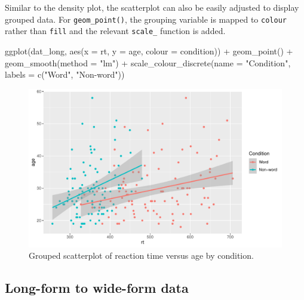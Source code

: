 \documentclass[
  english,
  doc,floatsintext]{apa6}
\newenvironment{Shaded}{\begin{snugshade}}{\end{snugshade}}
\newcommand{\AttributeTok}[1]{\textcolor[rgb]{0.77,0.63,0.00}{#1}}
\newcommand{\FunctionTok}[1]{\textcolor[rgb]{0.00,0.00,0.00}{#1}}
\newcommand{\NormalTok}[1]{#1}
\newcommand{\SpecialCharTok}[1]{\textcolor[rgb]{0.00,0.00,0.00}{#1}}
\newcommand{\StringTok}[1]{\textcolor[rgb]{0.31,0.60,0.02}{#1}}
\begin{document}
Similar to the density plot, the scatterplot can also be easily adjusted to display grouped data. For \texttt{geom\_point()}, the grouping variable is mapped to \texttt{colour} rather than \texttt{fill} and the relevant \texttt{scale\_} function is added.

\begin{Shaded}
\begin{Highlighting}[]
\FunctionTok{ggplot}\NormalTok{(dat\_long, }\FunctionTok{aes}\NormalTok{(}\AttributeTok{x =}\NormalTok{ rt, }\AttributeTok{y =}\NormalTok{ age, }\AttributeTok{colour =}\NormalTok{ condition)) }\SpecialCharTok{+}
  \FunctionTok{geom\_point}\NormalTok{() }\SpecialCharTok{+}
  \FunctionTok{geom\_smooth}\NormalTok{(}\AttributeTok{method =} \StringTok{"lm"}\NormalTok{) }\SpecialCharTok{+}
  \FunctionTok{scale\_colour\_discrete}\NormalTok{(}\AttributeTok{name =} \StringTok{"Condition"}\NormalTok{,}
                      \AttributeTok{labels =} \FunctionTok{c}\NormalTok{(}\StringTok{"Word"}\NormalTok{, }\StringTok{"Non{-}word"}\NormalTok{))}
\end{Highlighting}
\end{Shaded}

\begin{figure}

{\centering \includegraphics[width=1\linewidth]{images/scatter-grouped-1} 

}

\caption{Grouped scatterplot of reaction time versus age by condition.}\label{fig:scatter-grouped}
\end{figure}

\hypertarget{long-form-to-wide-form-data}{%
\subsection{Long-form to wide-form data}\label{long-form-to-wide-form-data}}
\end{document}
